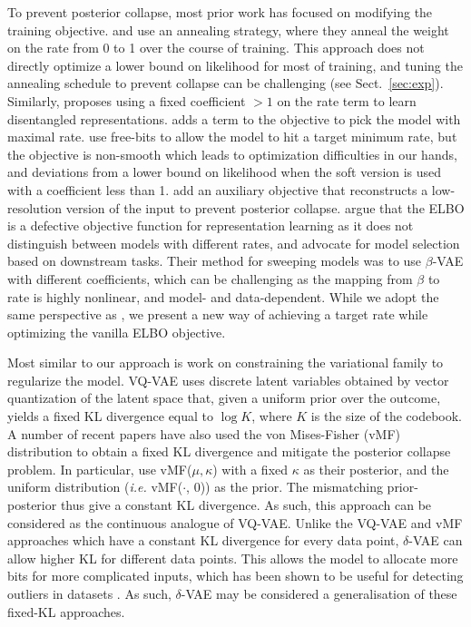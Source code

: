 \documentclass{article} \usepackage{iclr2019_conference,times}
\newcommand{\sref}[1]{Sect.~\ref{#1}}
\def\ie{\emph{i.e. }}
\begin{document}
To prevent posterior collapse, most prior work has focused on modifying the training objective. \citet{Bowman2015, Yang2017, SAVAE} and \citet{PixelVAE} use an annealing strategy, where they anneal the weight on the rate from 0 to 1 over the course of training. This approach does not directly optimize a lower bound on likelihood for most of training, and tuning the annealing schedule to prevent collapse can be challenging (see \sref{sec:exp}). Similarly, \citet{betavae} proposes using a fixed coefficient $>1$ on the rate term to learn disentangled representations. \citet{InfoVAE} adds a term to the objective to pick the model with maximal rate. \citet{VLAE, IAF} use free-bits to allow the model to hit a target minimum rate, but the objective is non-smooth which leads to optimization difficulties in our hands, and deviations from a lower bound on likelihood when the soft version is used with a coefficient less than 1. \citet{agave} add an auxiliary objective that reconstructs a low-resolution version of the input to prevent posterior collapse. \citet{Alemi2017} argue that the ELBO is a defective objective function for representation learning as it does not distinguish between models with different rates, and advocate for model selection based on downstream tasks. Their method for sweeping models was to use $\beta$-VAE with different coefficients, which can be challenging as the mapping from $\beta$ to rate is highly nonlinear, and model- and data-dependent. While we adopt the same perspective as \citet{Alemi2017}, we present a new way of achieving a target rate while optimizing the vanilla ELBO objective.


Most similar to our approach is work on constraining the variational family to regularize the model. 
VQ-VAE \citep{VQVAE} uses discrete latent variables obtained by vector quantization of the latent space that, given a uniform prior over the outcome, yields a fixed KL divergence equal to $\log K$, where $K$ is the size of the codebook. A number of recent papers have also used the von Mises-Fisher (vMF) distribution to obtain a fixed KL divergence and mitigate the posterior collapse problem. In particular, \citet{Guu2017, xu2018spherical, davidson2018hyperspherical} use vMF($\mu, \kappa$) with a fixed $\kappa$ as their posterior, and the uniform distribution (\ie vMF($\cdot$, 0)) as the prior. The mismatching prior-posterior thus give a constant KL divergence. As such, this approach can be considered as the continuous analogue of VQ-VAE. Unlike the VQ-VAE and vMF approaches which have a constant KL divergence for every data point, $\delta$-VAE can allow higher KL for different data points. This allows the model to allocate more bits for more complicated inputs, which has been shown to be useful for detecting outliers in datasets \citep{alemi2018uncertainty}. As such, $\delta$-VAE may be considered a generalisation of these fixed-KL approaches.
\end{document}
